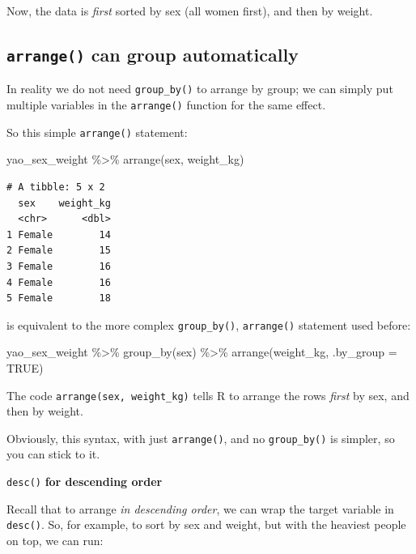 \documentclass[
  letterpaper,
  DIV=11,
  numbers=noendperiod]{scrreprt}
\newenvironment{Shaded}{\begin{snugshade}}{\end{snugshade}}
\newcommand{\AttributeTok}[1]{\textcolor[rgb]{0.40,0.45,0.13}{#1}}
\newcommand{\ConstantTok}[1]{\textcolor[rgb]{0.56,0.35,0.01}{#1}}
\newcommand{\FunctionTok}[1]{\textcolor[rgb]{0.28,0.35,0.67}{#1}}
\newcommand{\NormalTok}[1]{\textcolor[rgb]{0.00,0.23,0.31}{#1}}
\newcommand{\SpecialCharTok}[1]{\textcolor[rgb]{0.37,0.37,0.37}{#1}}
\begin{document}
Now, the data is \emph{first} sorted by sex (all women first), and then
by weight.

\subsection*{\texorpdfstring{\texttt{arrange()} can group
automatically}{arrange() can group automatically}}\label{arrange-can-group-automatically}

In reality we do not need \texttt{group\_by()} to arrange by group; we
can simply put multiple variables in the \texttt{arrange()} function for
the same effect.

So this simple \texttt{arrange()} statement:

\begin{Shaded}
\begin{Highlighting}[]
\NormalTok{yao\_sex\_weight }\SpecialCharTok{\%\textgreater{}\%} 
  \FunctionTok{arrange}\NormalTok{(sex, weight\_kg)}
\end{Highlighting}
\end{Shaded}

\begin{verbatim}
# A tibble: 5 x 2
  sex    weight_kg
  <chr>      <dbl>
1 Female        14
2 Female        15
3 Female        16
4 Female        16
5 Female        18
\end{verbatim}

is equivalent to the more complex \texttt{group\_by()},
\texttt{arrange()} statement used before:

\begin{Shaded}
\begin{Highlighting}[]
\NormalTok{yao\_sex\_weight }\SpecialCharTok{\%\textgreater{}\%} 
  \FunctionTok{group\_by}\NormalTok{(sex) }\SpecialCharTok{\%\textgreater{}\%} 
  \FunctionTok{arrange}\NormalTok{(weight\_kg, }\AttributeTok{.by\_group =} \ConstantTok{TRUE}\NormalTok{)}
\end{Highlighting}
\end{Shaded}

The code \texttt{arrange(sex,\ weight\_kg)} tells R to arrange the rows
\emph{first} by sex, and then by weight.

Obviously, this syntax, with just \texttt{arrange()}, and no
\texttt{group\_by()} is simpler, so you can stick to it.

\texttt{desc()} \textbf{for descending order}

Recall that to arrange \emph{in descending order}, we can wrap the
target variable in \texttt{desc()}. So, for example, to sort by sex and
weight, but with the heaviest people on top, we can run:
\end{document}
